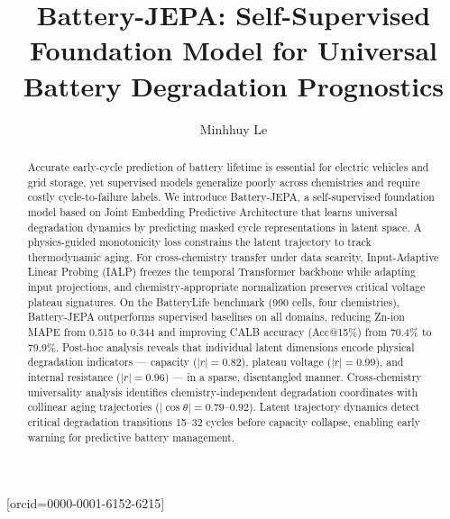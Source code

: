 \documentclass[a4paper,fleqn]{cas-dc}
\begin{document}
\let\WriteBookmarks\relax
\def\floatpagepagefraction{1}
\def\textpagefraction{.001}



\title [mode = title]{Battery-JEPA: Self-Supervised Foundation Model for Universal Battery Degradation Prognostics}  

\author[1]{Minhhuy Le}[orcid=0000-0001-6152-6215]
\cormark[1]



\begin{abstract}
Accurate early-cycle prediction of battery lifetime is essential for electric vehicles and grid storage, yet supervised models generalize poorly across chemistries and require costly cycle-to-failure labels. We introduce Battery-JEPA, a self-supervised foundation model based on Joint Embedding Predictive Architecture that learns universal degradation dynamics by predicting masked cycle representations in latent space. A physics-guided monotonicity loss constrains the latent trajectory to track thermodynamic aging. For cross-chemistry transfer under data scarcity, Input-Adaptive Linear Probing (IALP) freezes the temporal Transformer backbone while adapting input projections, and chemistry-appropriate normalization preserves critical voltage plateau signatures. On the BatteryLife benchmark (990 cells, four chemistries), Battery-JEPA outperforms supervised baselines on all domains, reducing Zn-ion MAPE from 0.515 to 0.344 and improving CALB accuracy (Acc@15\%) from 70.4\% to 79.9\%. Post-hoc analysis reveals that individual latent dimensions encode physical degradation indicators --- capacity ($|r|=0.82$), plateau voltage ($|r|=0.99$), and internal resistance ($|r|=0.96$) --- in a sparse, disentangled manner. Cross-chemistry universality analysis identifies chemistry-independent degradation coordinates with collinear aging trajectories ($|\cos\theta|=0.79$--$0.92$). Latent trajectory dynamics detect critical degradation transitions 15--32 cycles before capacity collapse, enabling early warning for predictive battery management.
\end{abstract}
\end{document}
